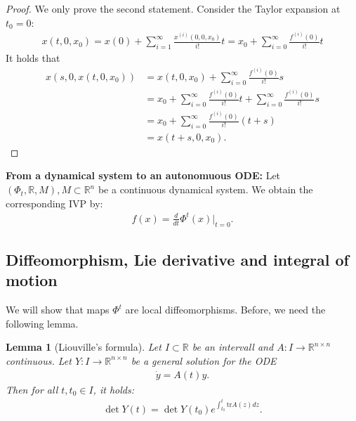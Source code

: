 \documentclass[hidelinks,a4paper, 11pt]{article}
\theoremstyle{plain}
\newtheorem{lemma}[theorem]{Lemma}
\theoremstyle{break}
\theoremstyle{plain}
\theoremstyle{definition}
\begin{document}
\begin{proof}
	We only prove the second statement. Consider the Taylor expansion at $t_0=0$:
	\begin{align*}
		x(t,0,x_0) = x(0) + \sum^\infty_{i=1}\frac{x^{(i)}(0,0,x_0)}{i!} t 
		= x_0 + \sum^\infty_{i=0}\frac{f^{(i)}(0)}{i!} t 
	\end{align*}
	It holds that
	\begin{align*}
		x(s,0,x(t,0,x_0)) &= x(t,0,x_0)+ \sum^\infty_{i=0}\frac{f^{(i)}(0)}{i!} s \\
		&= x_0 + \sum^\infty_{i=0}\frac{f^{(i)}(0)}{i!} t  + \sum^\infty_{i=0}\frac{f^{(i)}(0)}{i!} s  \\
		&= x_0 + \sum^\infty_{i=0}\frac{f^{(i)}(0)}{i!} (t+s)\\
		&= x(t+s,0,x_0). 
	\end{align*}
\end{proof}

\textbf{From a dynamical system to an autonomuous ODE:} Let $(\Phi_t, \mathbb R, M), M \subset \mathbb R^n$ be a continuous dynamical system. We obtain the corresponding IVP by:
\begin{align*}
	f(x) = \frac{d}{dt}\Phi^t(x) \Big \vert_{t=0}.
\end{align*}

\subsection{Diffeomorphism, Lie derivative and integral of motion}

We will show that maps $\Phi^t$ are local diffeomorphisms. Before, we need the following lemma.
\begin{lemma}[Liouville's formula]\label{formula:liouville}
	Let $I \subset \mathbb R$ be an intervall and $A: I \to \mathbb R^{n \times n}$ continuous. Let $Y: I \to \mathbb R^{n \times n}$ be a \emph{general} solution for the ODE
	\begin{align}\label{chap3:detproofreq}
		\dot y = A(t)y.
	\end{align}
	Then for all $t,t_0 \in I$, it holds:
	\begin{align}\label{chap3:liouville}
		\det Y(t) = \det Y(t_0) e^{\int^t_{t_0} \mathrm{tr} A(z) dz}.
	\end{align}
\end{lemma}
\end{document}
